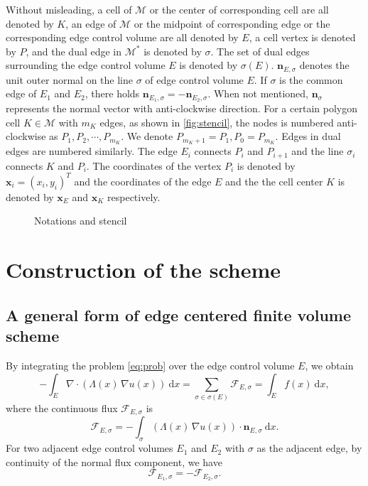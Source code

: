 \documentclass[times,review,preprint,authoryear]{elsarticle}
\newcommand{\bx}{\mathbf{x}}
\newcommand{\bn}{\mathbf{n}}
\begin{document}
Without misleading, a cell of $\mathcal{M}$ or the center of corresponding cell are all denoted by $K$, an edge of $\mathcal{M}$ or the midpoint of corresponding edge or the corresponding edge control volume are all denoted by $E$, a cell vertex is denoted by $P$, and the dual edge in $\mathcal{M}^*$ is denoted by $\sigma$.
The set of dual edges surrounding the edge control volume $E$ is denoted by $\sigma(E)$.
$\bn_{E, \sigma}$ denotes the unit outer normal on the line $\sigma$ of edge control volume $E$. If $\sigma$ is the common edge of $E_1$ and $E_2$, there holds $\bn_{E_1, \sigma} = -\bn_{E_2, \sigma}$. When not mentioned, $\bn_{\sigma}$ represents the normal vector with anti-clockwise direction.
For a certain polygon cell $K \in \mathcal{M}$ with $m_K$ edges, as shown in \cref{fig:stencil}, the nodes is numbered anti-clockwise as $P_1, P_2, \cdots, P_{m_K}$. We denote $P_{m_K+1} = P_{1}, P_{0} = P_{m_K}$. Edges in dual edges are numbered similarly. The edge $E_i$ connects $P_{i}$ and $P_{i+1}$ and the line $\sigma_i$ connects $K$ and $P_{i}$.
The coordinates of the vertex $P_i$ is denoted by $\bx_i = (x_i, y_i)^T$ and the coordinates of the edge $E$ and the the cell center $K$ is denoted by $\bx_{E}$ and $\bx_{K}$ respectively.

\begin{figure}[h]
\centering
\caption{Notations and stencil}
\end{figure}

\section{Construction of the scheme}\label{sec3}

\subsection{A general form of edge centered finite volume scheme}

By integrating the problem \cref{eq:prob} over the edge control volume $E$, we obtain
\begin{equation}
- \int_{E} \nabla \cdot (\Lambda(x) \, \nabla u(x)) \ \mathrm{d}x = \sum_{\sigma \in \sigma(E)} \mathcal{F}_{E, \sigma} = \int_{E} f(x) \ \mathrm{d}x,
\end{equation}
where the continuous flux $\mathcal{F}_{E, \sigma}$ is
\begin{equation*}
\mathcal{F}_{E, \sigma} = - \int_{\sigma} (\Lambda(x) \, \nabla u(x)) \cdot \bn_{E, \sigma} \ \mathrm{d}x.
\end{equation*}
For two adjacent edge control volumes $E_1$ and $E_2$ with $\sigma$ as the adjacent edge, by continuity of the normal flux component, we have
\begin{equation*}
\mathcal{F}_{E_1, \sigma} = - \mathcal{F}_{E_2, \sigma}.
\end{equation*}
\end{document}
